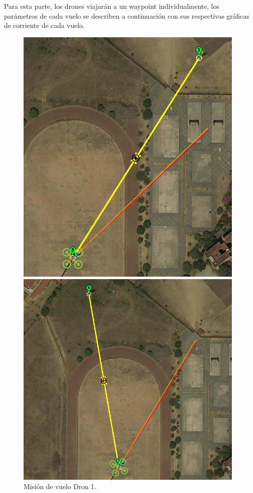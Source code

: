 Para esta parte, los drones viajarán a un waypoint individualmente, los parámetros de cada vuelo se describen a continuación con sus respectivas gráficas de corriente de cada vuelo.
\begin{figure}[h!]
    \begin{minipage}{0.3\linewidth}
        \centering
        \includegraphics[width=\linewidth]{imagenes/esq_2_1.png}
        \caption{Misión de vuelo Dron 1.}
        \label{fig:subfig1}
    \end{minipage}
    \hfill
    \begin{minipage}{0.3\linewidth}
        \centering
        \includegraphics[width=\linewidth]{imagenes/esq_2_2.png}

\end{minipage}
\end{figure}
